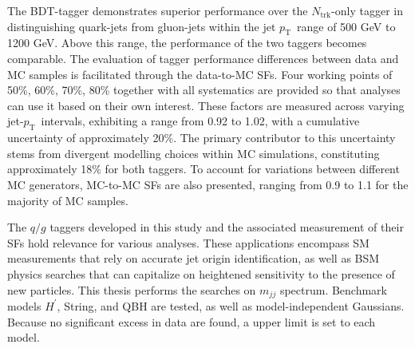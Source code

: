 \documentclass[UTF8,12pt]{ctexart}
\numberwithin{equation}{section}
\renewcommand {\thefigure} {\thesection{}.\arabic{figure}}%
\renewcommand {\thetable} {\thesection{}.\arabic{table}}
\newcommand{\ntrk}{\ensuremath{N_{\mathrm{trk}}}\xspace}
\newcommand{\pt}{\ensuremath{p_{\mathrm{T}}\xspace}}
\def\mjj{$m_{jj}$ }
\def\Hprime{\ensuremath{H^\prime}}
\begin{document}
The BDT-tagger demonstrates superior performance over the \ntrk-only tagger in distinguishing quark-jets from gluon-jets within the jet \pt~range of 500 GeV to 1200 GeV. Above this range, the performance of the two taggers becomes comparable. The evaluation of tagger performance differences between data and MC samples is facilitated through the data-to-MC SFs. Four working points of 50\%, 60\%, 70\%, 80\% together with all systematics are provided so that analyses can use it based on their own interest. These factors are measured across varying jet-\pt~intervals, exhibiting a range from 0.92 to 1.02, with a cumulative uncertainty of approximately 20\%. The primary contributor to this uncertainty stems from divergent modelling choices within MC simulations, constituting approximately 18\% for both taggers. To account for variations between different MC generators, MC-to-MC SFs are also presented, ranging from 0.9 to 1.1 for the majority of MC samples.

The $q/g$ taggers developed in this study and the associated measurement of their SFs hold relevance for various analyses. These applications encompass SM measurements that rely on accurate jet origin identification, as well as BSM physics searches that can capitalize on heightened sensitivity to the presence of new particles. This thesis performs the searches on \mjj spectrum. Benchmark models \Hprime, String, and QBH are tested, as well as model-independent Gaussians. Because no significant excess in data are found, a upper limit is set to each model.







\newpage
{}
\renewcommand\refname{REFERENCES}



\printbibliography






%
%
%
%
%
%
\end{document}
